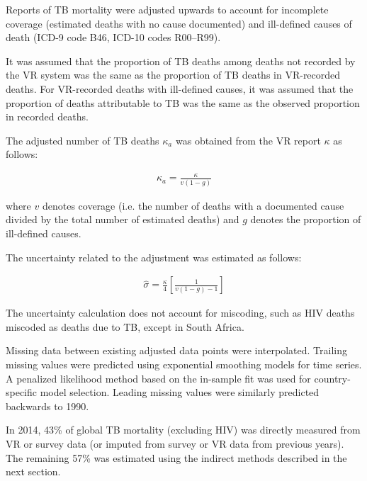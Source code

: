 Reports of TB mortality were adjusted upwards to account for incomplete coverage (estimated deaths with no cause documented) and ill-defined causes of death (ICD-9 code B46, ICD-10 codes R00–R99).\cite{15798840}

It was assumed that the proportion of TB deaths among deaths not recorded by the VR system was the same as the proportion of TB deaths in VR-recorded deaths. For VR-recorded deaths with ill-defined causes, it was assumed that the proportion of deaths attributable to TB was the same as the observed proportion in recorded deaths. 

The adjusted number of TB deaths $\kappa_a$ was obtained from the VR report $\kappa$ as follows:

\begin{align*}
\kappa_a = \frac{\kappa}{v(1-g)}
\end{align*}

where $v$ denotes coverage (i.e. the number of deaths with a documented cause divided by the total number of estimated deaths) and $g$ denotes the proportion of ill-defined causes.

The uncertainty related to the adjustment was estimated as follows: 

\begin{align*}
\hat{\sigma} = \frac{\kappa}{4} \left[\frac{1}{v(1-g) -1}\right]
\end{align*}

The uncertainty calculation does not account for miscoding, such as HIV deaths miscoded as deaths due to TB, except in South Africa. 

Missing data between existing adjusted data points were interpolated. Trailing missing values were predicted using exponential smoothing models for time series\cite{Hyndman2008-ax}. A penalized likelihood method based on the in-sample fit was used for country-specific model selection. Leading missing values were similarly predicted backwards to 1990. 

In 2014, 43\% of global TB mortality (excluding HIV) was directly measured from VR or survey data (or imputed from survey or VR data from previous years). The remaining 57\% was estimated using the indirect methods described in the next section.




